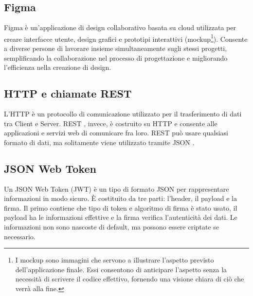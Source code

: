 \subsection{Figma}
Figma \cite{figma} è un'applicazione di design collaborativo basata su cloud utilizzata per creare interfacce utente, design grafici e prototipi interattivi (mockup\footnote{I mockup sono immagini che servono a illustrare l'aspetto previsto dell'applicazione finale. Essi consentono di anticipare l'aspetto senza la necessità di scrivere il codice effettivo, fornendo una visione chiara di ciò che verrà alla fine.}). Consente a diverse persone di lavorare insieme simultaneamente sugli stessi progetti, semplificando la collaborazione nel processo di progettazione e migliorando l'efficienza nella creazione di design.

\subsection{HTTP e chiamate REST}
L'HTTP è un protocollo di comunicazione utilizzato per il trasferimento di dati tra Client e Server. REST \cite{rest}, invece, è costruito su HTTP e consente alle applicazioni e servizi web di comunicare fra loro. REST può usare qualsiasi formato di dati, ma solitamente viene utilizzato tramite JSON \cite{json}. 

\subsection{JSON Web Token}
Un JSON Web Token (JWT) \cite{jwt} è un tipo di formato JSON per rappresentare informazioni in modo sicuro. È costituito da tre parti: l'header, il payload e la firma. Il primo contiene che tipo di token e algoritmo di firma è stato usato, il payload ha le informazioni effettive e la firma verifica l'autenticità dei dati. Le informazioni non sono nascoste di default, ma possono essere criptate se necessario.

